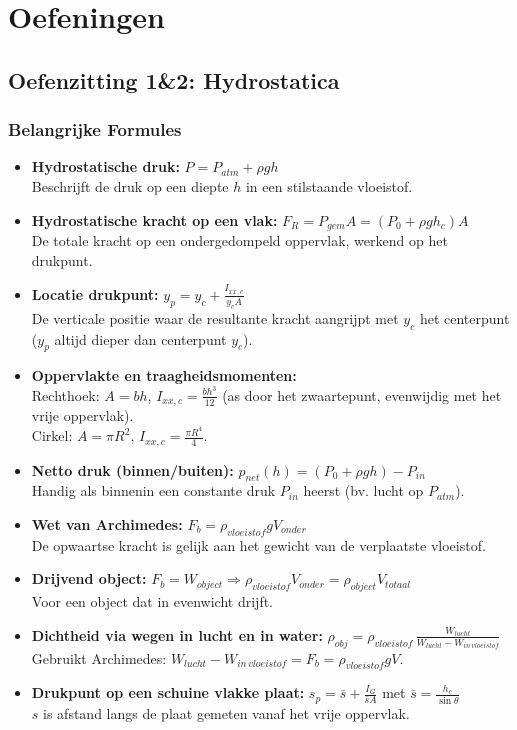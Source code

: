 \documentclass[a4paper,11pt,twoside]{report}
\newcounter{opgave}[section]
\begin{document}
\chapter{Oefeningen}
\section{Oefenzitting 1\&2: Hydrostatica}
\setcounter{opgave}{0}
\subsection*{Belangrijke Formules}
\begin{itemize}
    \item \textbf{Hydrostatische druk:} $P = P_{atm} + \rho g h$ \\
    Beschrijft de druk op een diepte $h$ in een stilstaande vloeistof.
    \item \textbf{Hydrostatische kracht op een vlak:} $F_R = P_{gem} A = (P_0 + \rho g h_c) A$ \\
    De totale kracht op een ondergedompeld oppervlak, werkend op het drukpunt.
    \item \textbf{Locatie drukpunt:} $y_p = y_c + \frac{I_{xx,c}}{y_c A}$ \\
    De verticale positie waar de resultante kracht aangrijpt met {$y_c$} het centerpunt ($y_p$ altijd dieper dan centerpunt $y_c$).
    \item \textbf{Oppervlakte en traagheidsmomenten:} \\
    Rechthoek: $A = b h$, $I_{xx,c} = \frac{b h^3}{12}$ (as door het zwaartepunt, evenwijdig met het vrije oppervlak). \\
    Cirkel: $A = \pi R^2$, $I_{xx,c} = \frac{\pi R^4}{4}$.
    \item \textbf{Netto druk (binnen/buiten):} $p_{net}(h) = (P_0 + \rho g h) - P_{in}$ \\
    Handig als binnenin een constante druk $P_{in}$ heerst (bv. lucht op $P_{atm}$).
    \item \textbf{Wet van Archimedes:} $F_b = \rho_{vloeistof} g V_{onder}$ \\
    De opwaartse kracht is gelijk aan het gewicht van de verplaatste vloeistof.
    \item \textbf{Drijvend object:} $F_b = W_{object} \Rightarrow \rho_{vloeistof} V_{onder} = \rho_{object} V_{totaal}$ \\
    Voor een object dat in evenwicht drijft.
    \item \textbf{Dichtheid via wegen in lucht en in water:} $\displaystyle \rho_{obj}=\rho_{vloeistof}\,\frac{W_{lucht}}{W_{lucht}-W_{in\,vloeistof}}$ \\
    Gebruikt Archimedes: $W_{lucht}-W_{in\,vloeistof}=F_b=\rho_{vloeistof}gV$.
    \item \textbf{Drukpunt op een schuine vlakke plaat:} $\displaystyle s_p = \bar{s} + \frac{I_{G}}{\bar{s}A}$ met $\bar{s}=\frac{h_c}{\sin\theta}$ \\
    $s$ is afstand langs de plaat gemeten vanaf het vrije oppervlak.
\end{itemize}
\end{document}

